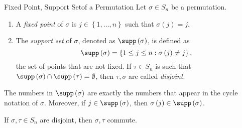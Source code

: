 \documentclass[pmath347]{subfiles}
\begin{document}
    \begin{definition}{Fixed Point, Support Set}{of a Permutation}
        Let $\sigma\in S_n$ be a permutation.
        \begin{enumerate}
            \item A \emph{fixed point} of $\sigma$ is $j\in \left\lbrace 1,\ldots,n \right\rbrace$ such that $\sigma\left( j \right) = j$.
            \item The \emph{support set} of $\sigma$, denoted as $\supp\left( \sigma \right)$, is defined as
                \begin{equation*}
                    \supp\left( \sigma \right) = \left\lbrace 1\leq j\leq n: \sigma\left( j \right) \neq j \right\rbrace ,
                \end{equation*}
                the set of points that are not fixed. If $\tau\in S_n$ is such that $\supp\left( \sigma \right) \cap \supp\left( \tau \right) = \emptyset$, then $\tau,\sigma$ are called \emph{disjoint}.
        \end{enumerate}
    \end{definition}
    
    \noindent The numbers in $\supp\left( \sigma \right)$ are exactly the numbers that appear in the cycle notation of $\sigma$. Moreover, if $j\in\supp\left( \sigma \right)$, then $\sigma\left( j \right) \in\supp\left( \sigma \right)$.
    
    \begin{prop}{}
        If $\sigma,\tau\in S_n$ are disjoint, then $\sigma,\tau$ commute.
    \end{prop}
\end{document}
